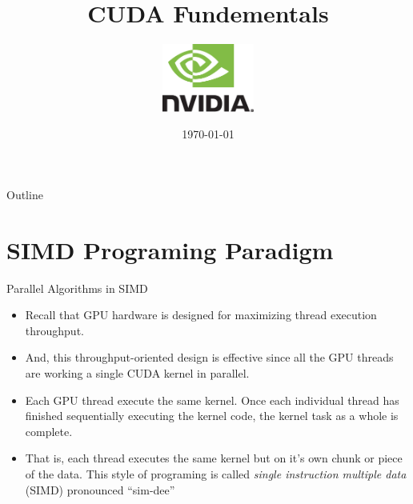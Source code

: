 \documentclass[handout]{beamer}
\title{CUDA Fundementals}
\author{
	\includegraphics[width=3cm]{../media/logo/NVLogo_2D.eps}
	\vspace{0.75cm}
	\\}
\date{\today}
\begin{document}
\frame{\titlepage}

\begin{frame}{Outline}
\tableofcontents
\end{frame}




\section{SIMD Programing Paradigm}
\begin{frame}{Parallel Algorithms in SIMD}
\begin{itemize}
\itemsep1em
	\item<1->Recall that GPU hardware is designed for maximizing thread execution throughput.
	\item<1->And, this throughput-oriented design is effective since all the GPU threads are working a single CUDA kernel in parallel.
	\item<1->Each GPU thread execute the same kernel.  Once each individual thread has finished sequentially executing the kernel code, the kernel task as a whole is complete.  
	\item<1->That is, each thread executes the same kernel but on it's own chunk or piece of the data.  This style of programing is called \emph{single instruction multiple data} (SIMD) pronounced ``sim-dee''
\end{itemize}
\end{frame}
\end{document}

